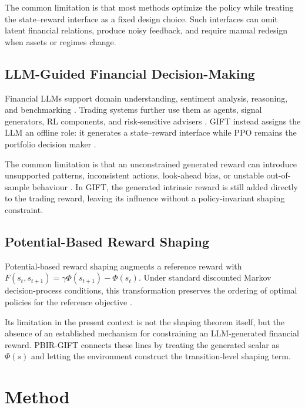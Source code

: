 \documentclass[pdflatex,sn-basic,Numbered]{sn-jnl}
\begin{document}
The common limitation is that most methods optimize the policy while treating the state--reward interface as a fixed design choice. Such interfaces can omit latent financial relations, produce noisy feedback, and require manual redesign when assets or regimes change.

\hypertarget{llm-guided-financial-decision-making}{%
\subsection{LLM-Guided Financial Decision-Making}\label{llm-guided-financial-decision-making}}

Financial LLMs support domain understanding, sentiment analysis, reasoning, and benchmarking \cite{ref25,ref26,ref27,ref28}. Trading systems further use them as agents, signal generators, RL components, and risk-sensitive advisers \cite{ref17,ref18,ref19,ref20}. GIFT instead assigns the LLM an offline role: it generates a state--reward interface while PPO remains the portfolio decision maker \cite{ref29}.

The common limitation is that an unconstrained generated reward can introduce unsupported patterns, inconsistent actions, look-ahead bias, or unstable out-of-sample behaviour \cite{ref23,ref24}. In GIFT, the generated intrinsic reward is still added directly to the trading reward, leaving its influence without a policy-invariant shaping constraint.

\hypertarget{potential-based-reward-shaping}{%
\subsection{Potential-Based Reward Shaping}\label{potential-based-reward-shaping}}

Potential-based reward shaping augments a reference reward with \(F(s_t,s_{t+1})=\gamma\Phi(s_{t+1})-\Phi(s_t)\). Under standard discounted Markov decision-process conditions, this transformation preserves the ordering of optimal policies for the reference objective \cite{ref30}.

Its limitation in the present context is not the shaping theorem itself, but the absence of an established mechanism for constraining an LLM-generated financial reward. PBIR-GIFT connects these lines by treating the generated scalar as \(\Phi(s)\) and letting the environment construct the transition-level shaping term.

\hypertarget{method}{%
\section{Method}\label{method}}
\end{document}
